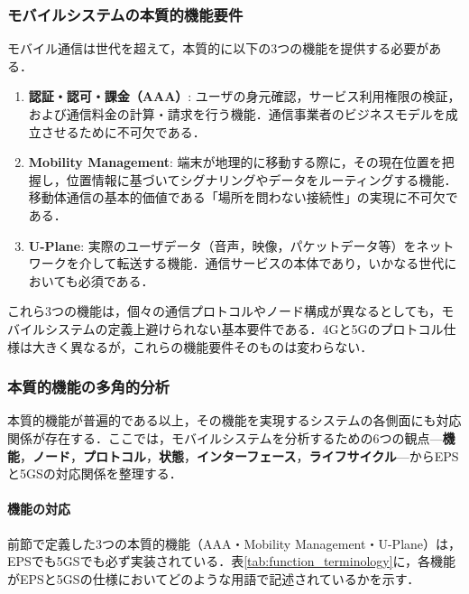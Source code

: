 \subsubsection{モバイルシステムの本質的機能要件}

モバイル通信は世代を超えて，本質的に以下の3つの機能を提供する必要がある．

\begin{enumerate}
\item \textbf{認証・認可・課金（AAA）}: ユーザの身元確認，サービス利用権限の検証，および通信料金の計算・請求を行う機能．通信事業者のビジネスモデルを成立させるために不可欠である．

\item \textbf{Mobility Management}: 端末が地理的に移動する際に，その現在位置を把握し，位置情報に基づいてシグナリングやデータをルーティングする機能．移動体通信の基本的価値である「場所を問わない接続性」の実現に不可欠である．

\item \textbf{U-Plane}: 実際のユーザデータ（音声，映像，パケットデータ等）をネットワークを介して転送する機能．通信サービスの本体であり，いかなる世代においても必須である．
\end{enumerate}

これら3つの機能は，個々の通信プロトコルやノード構成が異なるとしても，モバイルシステムの定義上避けられない基本要件である．4Gと5Gのプロトコル仕様は大きく異なるが，これらの機能要件そのものは変わらない．

\subsubsection{本質的機能の多角的分析}

本質的機能が普遍的である以上，その機能を実現するシステムの各側面にも対応関係が存在する．ここでは，モバイルシステムを分析するための6つの観点---\textbf{機能}，\textbf{ノード}，\textbf{プロトコル}，\textbf{状態}，\textbf{インターフェース}，\textbf{ライフサイクル}---からEPSと5GSの対応関係を整理する．

\paragraph{機能の対応}

前節で定義した3つの本質的機能（AAA・Mobility Management・U-Plane）は，EPSでも5GSでも必ず実装されている．表\ref{tab:function_terminology}に，各機能がEPSと5GSの仕様においてどのような用語で記述されているかを示す．

